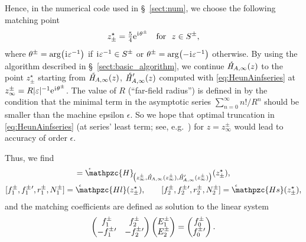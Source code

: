 \documentclass[11pt]{article}
\newcommand{\MF}[1]{\mathop{#1}\nolimits}
\newcommand{\ii}{\kern0.05em\mathrm{i}\kern0.05em} \newcommand{\E}[1]{\textrm{e}^{#1}}
\newcommand{\SectInf}{S}%
\def\midpoint#1{z^\star_{#1}}%
\def\HeunC{\displaystyle\setbox0=\hbox{\tiny\itshape\bfseries \kern1.52mm c}\wd0=0pt\ht0=0pt\dp0=0pt\MF{\textit{\hbox{\raise1.67ex\copy0}H\/}}}%
\def\HeunCtxst{\scalebox{0.735}{\ensuremath{\HeunC}}}%
\def\psHeunC{\setbox0=\hbox{\tiny\itshape\bfseries \kern1.56mm c}\wd0=0pt\ht0=0pt\dp0=0pt\MF{\hbox{\raise1.67ex\copy0}\mathpzc{H}}}%
\def\psHeunClfin{\setbox0=\hbox{\tiny\itshape\bfseries \kern1.52mm c}\wd0=0pt\ht0=0pt\dp0=0pt\MF{\hbox{\raise1.67ex\copy0}\mathpzc{Hl}}}%
\def\psHeunCsfin{\setbox0=\hbox{\tiny\itshape\bfseries \kern1.52mm c}\wd0=0pt\ht0=0pt\dp0=0pt\MF{\hbox{\raise1.67ex\copy0}\mathpzc{Hs}}}%
\begin{document}
Hence, in the numerical code \cite{mycode2} used in \S~\ref{sect:num}, we choose the following matching point
\[
\midpoint{\pm} = \tfrac{5}{4}\E{\ii\theta^\pm} \quad\mbox{for}\ \
z\in\SectInf^{\pm},
\]
where $\theta^{\pm}=\arg\bigl(\ii\varepsilon^{-1}\bigr)$ if $\ii\varepsilon^{-1}\in\SectInf^{\pm}$ or $\theta^{\pm}=\arg\bigl(-\ii\varepsilon^{-1}\bigr)$ otherwise.
By using the algorithm described in \S~\ref{sect:basic_algorithm}, we continue $\HeunC_{\!A,\infty}(z)$  to the point $\midpoint{\pm}$ starting from $\HeunC_{\!A,\infty}(z)$, $\HeunC'_{\!A,\infty}(z)$ computed with \eqref{eq:HeunAinfseries} at $z^\pm_\infty=R|\varepsilon|^{-1}\E{\ii\theta^\pm}$. The value of $R$ (``far-field radius'') is defined in \cite{mycode2} by the condition that the minimal term in the asymptotic series $\sum_{n=0}^{\infty} n!/R^n$ should be smaller than the machine epsilon $\epsilon$. So we hope that optimal truncation in \eqref{eq:HeunAinfseries} (at series' least term; see, e.g.\ \cite{BerryHowls2015}) for  $z=z_\infty^\pm$ would lead to accuracy of order $\epsilon$.

Thus, we find
\begin{gather*}
 [f^\pm_0,f^\pm_0\vphantom{f}',r^\pm_0,N^\pm_0]=
\psHeunC_{\!\bigl(z^\pm_\infty,\HeunCtxst_{\!A,\infty}(z^\pm_\infty), \HeunCtxst'_{\!A,\infty}(z^\pm_\infty)\bigr)}(\midpoint{\pm}),\\
 [f^\pm_1,f^\pm_1\vphantom{f}',r^\pm_1,N^\pm_1]=\psHeunClfin(\midpoint{\pm}),\qquad
 [f^\pm_2,f^\pm_2\vphantom{f}',r^\pm_2,N^\pm_2]=\psHeunCsfin(\midpoint{\pm}),
\end{gather*}
and the matching coefficients are defined as solution to the linear system
\[
\left(\begin{matrix} f^\pm_1 & f^\pm_2\\
 -f^\pm_1\vphantom{f}' & -f^\pm_2\vphantom{f}'
\end{matrix}\right)
\left(\begin{matrix}
E^\pm_1\\E^\pm_2
\end{matrix}\right)=
\left(\begin{matrix}
f^\pm_0\\f^\pm_0\vphantom{f}'
\end{matrix}\right).
\]
\end{document}
